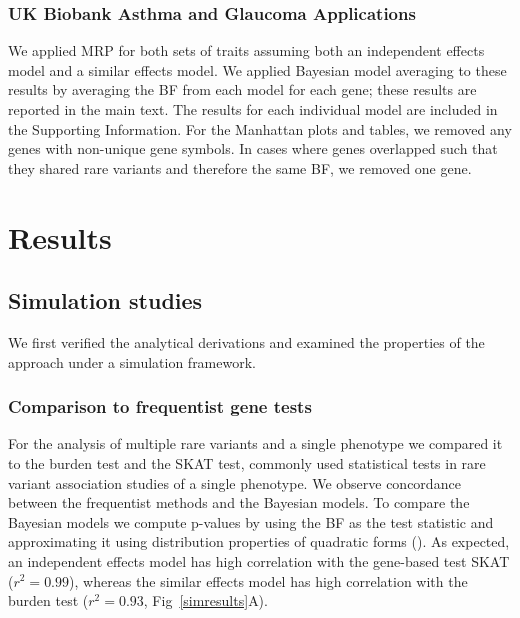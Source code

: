 \subsubsection*{UK Biobank Asthma and Glaucoma Applications}
We applied MRP for both sets of traits assuming both an independent effects model and a similar effects model. We applied Bayesian model averaging to these results by averaging the BF from each model for each gene; these results are reported in the main text. The results for each individual model are included in the Supporting Information. For the Manhattan plots and tables, we removed any genes with non-unique gene symbols. In cases where genes overlapped such that they shared rare variants and therefore the same BF, we removed one gene.

\section*{Results}

\subsection*{Simulation studies}
We first verified the analytical derivations and examined the properties of the approach under a simulation framework. 

\subsubsection*{Comparison to frequentist gene tests}
For the analysis of multiple rare variants and a single phenotype we compared it to the burden test and the SKAT test, commonly used statistical tests in rare variant association studies of a single phenotype. We observe concordance between the frequentist methods and the Bayesian models. To compare the Bayesian models we compute p-values by using the BF as the test statistic and approximating it using distribution properties of quadratic forms (). As expected, an independent effects model has high correlation with the gene-based test SKAT ($r^2 = 0.99$), whereas the similar effects model has high correlation with the burden test ($r^2 = 0.93$, Fig~\ref{simresults}A). 

